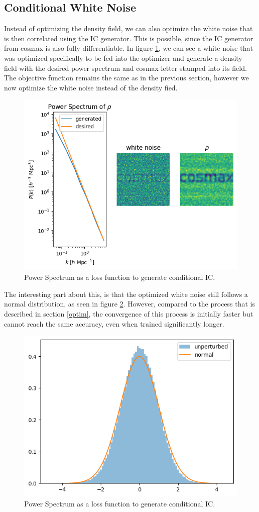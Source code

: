 \documentclass{article}
\begin{document}
{\begin{appendices}
\subsection{Conditional White Noise}
\label{white-noise}

Instead of optimizing the density field, we can also optimize the white noise that is then correlated using the IC generator. This is possible, since the IC generator from cosmax is also fully differentiable. In figure \ref{fig:cosmax-white-noise}, we can see a white noise that was optimized specifically to be fed into the optimizer and generate a density field with the desired power spectrum and cosmax letter stamped into its field. The objective function remains the same as in the previous section, however we now optimize the white noise instead of the density fied.

\begin{figure}[h]
    \centering
    \includegraphics[width=0.5\linewidth]{img/cond_ic_2.png}
    \caption{Power Spectrum as a loss function to generate conditional IC.}
    \label{fig:cosmax-white-noise}
\end{figure}

The interesting part about this, is that the optimized white noise still follows a normal distribution, as seen in figure \ref{fig:white-distr}. However, compared to the process that is described in section \ref{optim}, the convergence of this process is initially faster but cannot reach the same accuracy, even when trained significantly longer.

\begin{figure}[h]
    \centering
    \includegraphics[width=0.5\linewidth]{img/noise.png}
    \caption{Power Spectrum as a loss function to generate conditional IC.}
    \label{fig:white-distr}
\end{figure}



\end{appendices}}
\end{document}
